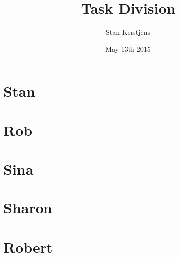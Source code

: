 \documentclass{article}
\title{Task Division}
\author{Stan Kerstjens}
\date{May 13th 2015}
\begin{document}
	\maketitle
	\section{Stan}
		
		\newpage
	\section{Rob}
		
		\newpage
	\section{Sina}
		
		\newpage
	\section{Sharon}
		
		\newpage
	\section{Robert}
		
\end{document}
